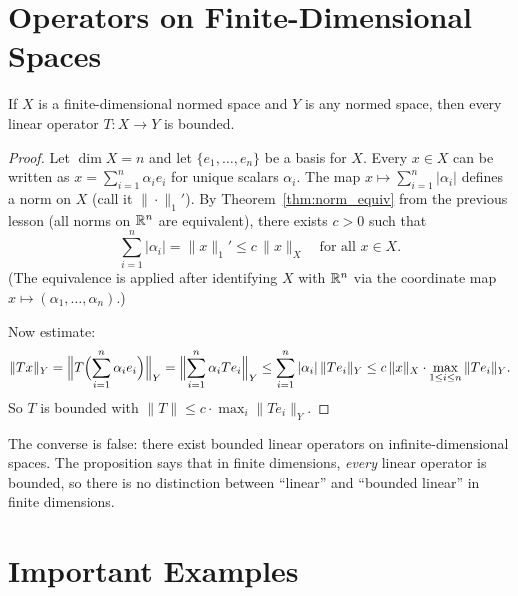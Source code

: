 \documentclass[11pt,a4paper]{article}
\begin{document}

\section{Operators on Finite-Dimensional Spaces}
\label{sec:finite_dim}

\begin{proposition}
\label{prop:finite_dim_bounded}
If $X$ is a finite-dimensional normed space and $Y$ is any normed space, then
every linear operator $T \colon X \to Y$ is bounded.
\end{proposition}

\begin{proof}
Let $\dim X = n$ and let $\{e_1, \ldots, e_n\}$ be a basis for $X$. Every
$x \in X$ can be written as $x = \sum_{i=1}^n \alpha_i e_i$ for unique
scalars $\alpha_i$. The map $x \mapsto \sum_{i=1}^n |\alpha_i|$ defines a
norm on $X$ (call it $\|\cdot\|_1'$). By Theorem~\ref{thm:norm_equiv} from
the previous lesson (all norms on $\mathbb{R}^n$ are equivalent), there exists
$c > 0$ such that
\[
\sum_{i=1}^n |\alpha_i| = \|x\|_1' \le c \, \|x\|_X \quad
\text{for all } x \in X.
\]
(The equivalence is applied after identifying $X$ with $\mathbb{R}^n$ via the
coordinate map $x \mapsto (\alpha_1, \ldots, \alpha_n)$.)

Now estimate:
\[
\|Tx\|_Y = \Bigl\|T\Bigl(\sum_{i=1}^n \alpha_i e_i\Bigr)\Bigr\|_Y
= \Bigl\|\sum_{i=1}^n \alpha_i Te_i\Bigr\|_Y
\le \sum_{i=1}^n |\alpha_i| \, \|Te_i\|_Y
\le c \, \|x\|_X \cdot \max_{1 \le i \le n} \|Te_i\|_Y.
\]
So $T$ is bounded with $\|T\| \le c \cdot \max_i \|Te_i\|_Y$.
\end{proof}

\begin{remark}
The converse is false: there exist bounded linear operators on
infinite-dimensional spaces. The proposition says that in finite dimensions,
\emph{every} linear operator is bounded, so there is no distinction between
``linear'' and ``bounded linear'' in finite dimensions.
\end{remark}


\section{Important Examples}
\label{sec:examples}
\end{document}
